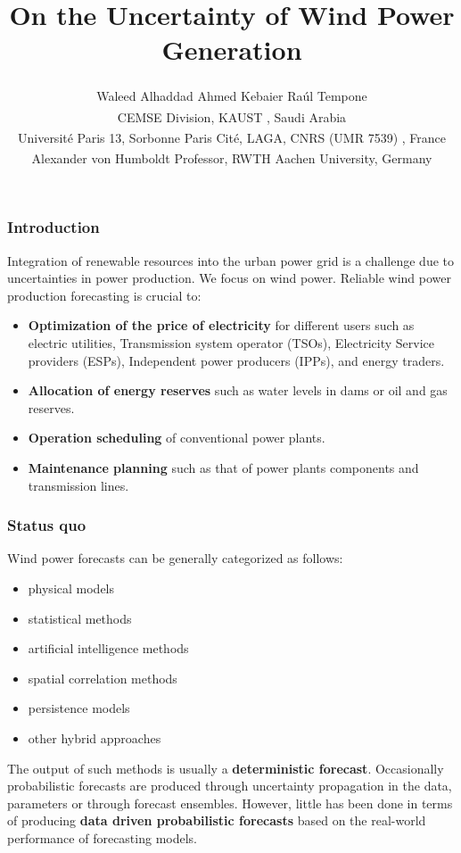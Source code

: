 \documentclass[aspectratio=169]{beamer}\usepackage[utf8]{inputenc}
\title{On the Uncertainty of Wind Power Generation}
\author{ Waleed Alhaddad\textsuperscript{\textasteriskcentered} \qquad Ahmed Kebaier\textsuperscript{\ddag} \qquad Ra\'ul  Tempone\textsuperscript{\textasteriskcentered}\textsuperscript{\textdagger} \\  \vskip 0.2in
\textsuperscript{\textasteriskcentered}CEMSE Division, KAUST , Saudi Arabia
 \\ \textsuperscript{\ddag}Université Paris 13, Sorbonne Paris Cité, LAGA, CNRS (UMR 7539) , France  \\ \textsuperscript{\textdagger}Alexander von Humboldt Professor, RWTH Aachen University,  Germany}
\begin{document}


\begin{frame}
\titlepage
\end{frame}

\begin{frame}[label=guide]\frametitle{ Introduction }
Integration of renewable resources into the urban power grid is a challenge due to uncertainties in power production. We focus on wind power. Reliable wind power production forecasting is crucial to:
\begin{itemize}
\item \textbf{Optimization of the price of electricity} for different users such as electric utilities, Transmission system operator (TSOs), Electricity Service providers (ESPs), Independent power producers (IPPs), and energy traders.
\item \textbf{Allocation of energy reserves} such as water levels in dams or oil and gas reserves.
\item \textbf{Operation scheduling} of conventional power plants.
\item \textbf{Maintenance planning} such as that of power plants components and transmission lines.
\end{itemize}

\end{frame}

\begin{frame}\frametitle{Status quo }
  Wind power forecasts can be generally categorized as follows:
  \begin{itemize}
    \item physical models
    \item statistical methods
    \item artificial intelligence methods
    \item spatial correlation methods
    \item persistence models
    \item other hybrid approaches
  \end{itemize}
 The output of such methods is usually a \textbf{deterministic forecast}. Occasionally probabilistic forecasts are produced through uncertainty propagation in the data, parameters or through forecast ensembles. However, little has been done in terms of producing \textbf{data driven probabilistic forecasts} based on the real-world performance of forecasting models.
\end{frame}
\end{document}
